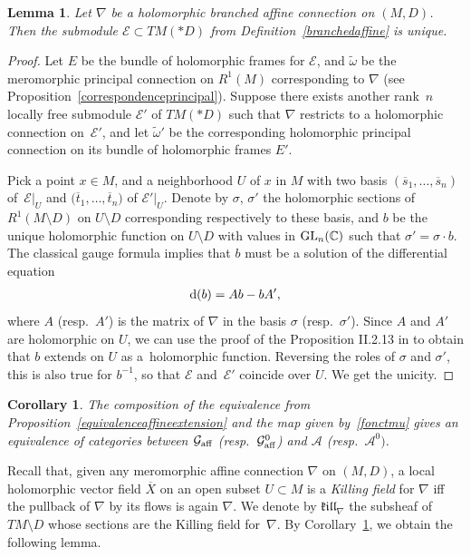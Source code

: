 \documentclass[10pt,a4paper]{amsart}
\numberwithin{equation}{section}
\newtheorem{Corollary}[Theorem]{Corollary}
\newtheorem{Lemma}[Theorem]{Lemma}
\begin{document}
 \begin{Lemma}\label{lemmabranchedaffine} Let $\nabla$ be a holomorphic branched affine connection on $(M,D)$. Then the submodule $\mathcal{E}\subset TM(* D)$ from Definition~{\rm \ref{branchedaffine}} is unique. \end{Lemma}
 \begin{proof} Let $E$ be the bundle of holomorphic frames for $\mathcal{E}$, and $\tilde{\omega}$ be the meromorphic principal connection on $R^1(M)$ corresponding to $\nabla$ (see Proposition~\ref{correspondenceprincipal}). Suppose there exists another rank~$n$ locally free submodule $\mathcal{E}'$ of $TM(* D)$ such that $\nabla$ restricts to a holomorphic connection on~$\mathcal{E}'$, and let $\tilde{\omega}'$ be the corresponding holomorphic principal connection on its bundle of holomorphic frames $E'$.

 Pick a point $x\in M$, and a neighborhood $U$ of $x$ in $M$ with two basis $(\overline{s}_1,\dots,\overline{s}_n)$ of~$\mathcal{E}\vert_U$ and $\big(\overline{t}_1,\dots,\overline{t}_n\big)$ of $\mathcal{E}'\vert_U$. Denote by $\sigma$, $\sigma'$ the holomorphic sections of $R^1(M\setminus D)$ on $U\setminus D$ corresponding respectively to these basis, and $b$ be the unique holomorphic function on $U\setminus D$ with values in ${\rm GL}_n(\mathbb{C})$ such that $\sigma'=\sigma\cdot b$. The classical gauge formula implies that $b$ must be a solution of the differential equation
 \begin{gather*} {\rm d}(b) = Ab - bA', \end{gather*}
 where $A$ (resp.\ $A'$) is the matrix of $\nabla$ in the basis $\sigma$ (resp.\ $\sigma'$). Since $A$ and $A'$ are holomorphic on $U$, we can use the proof of the Proposition II.2.13 in \cite{Sabbah} to obtain that $b$ extends on $U$ as a~holomorphic function. Reversing the roles of $\sigma$ and $\sigma'$, this is also true for $b^{-1}$, so that $\mathcal{E}$ and~$\mathcal{E}'$ coincide over $U$. We get the unicity.
 \end{proof}

\begin{Corollary}\label{equivalencetorsion} The composition of the equivalence from Proposition~{\rm \ref{equivalenceaffineextension}} and the map given by~\eqref{fonctmu} gives an equivalence of categories between $\mathcal{G}_{\rm aff}$ \big(resp.\ $\mathcal{G}_{\rm aff}^0$\big) and $\mathcal{A}$ \big(resp.\ $\mathcal{A}^0\big)$.
\end{Corollary}
Recall that, given any meromorphic affine connection $\nabla$ on $(M,D)$, a local holomorphic vector field $\overline{X}$ on an open subset $U\subset M$ is a \textit{Killing field} for $\nabla$ iff the pullback of $\nabla$ by its flows is again $\nabla$. We denote by $\mathfrak{k}\mathfrak{i}\mathfrak{l}\mathfrak{l}_{\nabla}$ the subsheaf of $TM\setminus D$ whose sections are the Killing field for~$\nabla$. By Corollary~\ref{equivalencetorsion}, we obtain the following lemma.
\end{document}
